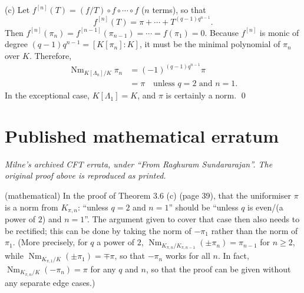 \documentclass[11pt,a4paper]{article}
\begin{document}
\clearpage
\noindent(c) Let $f^{[n]}(T)=(f/T)\circ f\circ\cdots\circ f$ ($n$ terms), so that
\[
f^{[n]}(T)=\pi+\cdots+T^{(q-1)q^{n-1}}.
\]
Then $f^{[n]}(\pi_n)=f^{[n-1]}(\pi_{n-1})=\cdots=f(\pi_1)=0$.
Because $f^{[n]}$ is monic of degree $(q-1)q^{n-1}=[K[\pi_n]:K]$,
it must be the minimal polynomial of $\pi_n$ over $K$. Therefore,
\[
\begin{aligned}
\operatorname{Nm}_{K[\Lambda_n]/K}\pi_n&=(-1)^{(q-1)q^{n-1}}\pi\\
 &=\pi\quad\text{unless $q=2$ and $n=1$.}
\end{aligned}
\]
In the exceptional case, $K[\Lambda_1]=K$, and $\pi$ is certainly a norm.
\qed

\section*{Published mathematical erratum}
\noindent\emph{Milne's archived CFT errata, under \textquotedblleft From Raghuram
Sundararajan\textquotedblright. The original proof above is reproduced as printed.}
\par\medskip
\noindent (mathematical) In the proof of Theorem 3.6 (c) (page 39), that the
uniformiser $\pi$ is a norm from $K_{\pi,n}$: \textquotedblleft unless $q=2$ and $n=1$\textquotedblright{}
should be \textquotedblleft unless $q$ is even/(a power of $2$) and $n=1$\textquotedblright.
The argument given to cover that case then also needs to be rectified; this can be done
by taking the norm of $-\pi_1$ rather than the norm of $\pi_1$. (More
precisely, for $q$ a power of $2$,
$\operatorname{Nm}_{K_{\pi,n}/K_{\pi,n-1}}(\pm\pi_n)=\pi_{n-1}$
for $n\geq 2$, while
$\operatorname{Nm}_{K_{\pi,1}/K}(\pm\pi_1)=\mp\pi$, so that $-\pi_n$
works for all $n$. In fact, $\operatorname{Nm}_{K_{\pi,n}/K}(-\pi_n)=\pi$
for any $q$ and $n$, so that the proof can be given without any separate
edge cases.)

\clearpage
\end{document}
